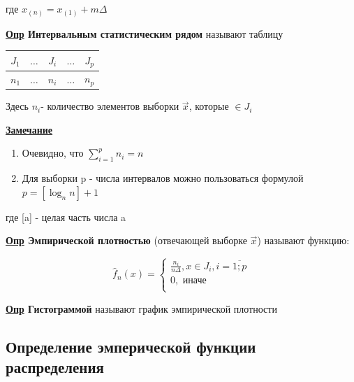 \documentclass[12pt, a4paper]{report}
\begin{document}
	\vspace{0.5cm}где $x_{(n)} = x_{(1)} + m\Delta$
	
	\vspace{0.5cm}\textbf{\underline{Опр} Интервальным статистическим рядом} называют таблицу
	
	\begin{table}[H]
		\centering
		\begin{tabular}{|c|c|c|c|c|}
			\hline
			$J_1$ & $\dots$ & $J_i$ & $\dots$ & $J_p$ \\
			\hline
			$n_1$ & $\dots$ & $n_i$ & $\dots$ & $n_p$ \\
			\hline
		\end{tabular}
	\end{table}
	
	Здесь $n_i$- количество элементов выборки $\vec{x}$, которые $\in J_i$
	
	\vspace{0.3cm}\textbf{\underline{Замечание}}
	
	\begin{enumerate}
		\item Очевидно, что $\sum_{i=1}^p n_i = n$
		\item Для выборки p - числа интервалов можно пользоваться формулой $p = [\log_n n]+1$
	\end{enumerate}
	
	где [a] - целая часть числа a
	
	\vspace{0.5cm}\textbf{\underline{Опр} Эмпирической плотностью} (отвечающей выборке $\vec{x}$) называют функцию:
	
	\begin{equation*}
	\hat f_n(x) =
	\begin{cases}
	\frac{n_i}{n \Delta}, x \in J_i, i = \overline{1; p} \\
	0, \text{ иначе} \\
	\end{cases}
	\end{equation*}
	
	\textbf{\underline{Опр} Гистограммой} называют график эмпирической плотности
	
	
	\vspace{0.5cm}
	\subsection{Определение эмперической функции распределения}
	
	\hspace{0.5cm}
	
\end{document}
